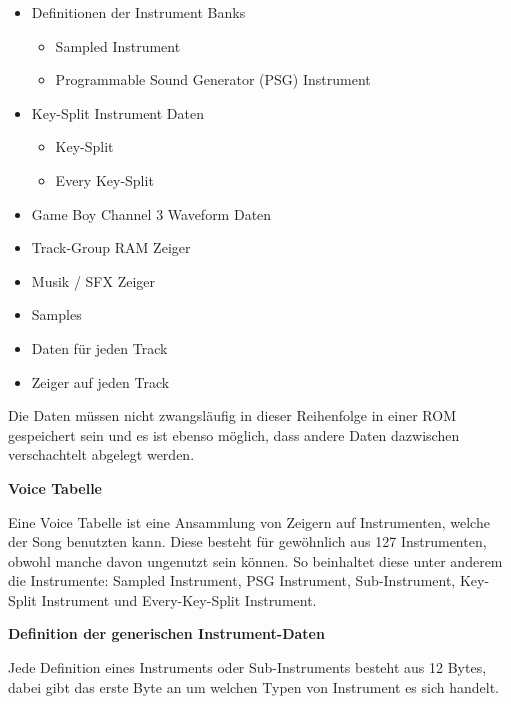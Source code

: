 \documentclass[11pt,a4paper]{scrartcl}
\newcommand{\paratitle}[1] {
    \vspace{5mm}
    \large \textbf{#1} \normalsize
    \vspace{2mm}\newline
}
\begin{document}
\begin{itemize}
    \item Definitionen der Instrument Banks
    \begin{itemize}
        \item Sampled Instrument
        \item Programmable Sound Generator (PSG) Instrument
    \end{itemize}
    
    \item Key-Split Instrument Daten
    \begin{itemize}
        \item Key-Split
        \item Every Key-Split
    \end{itemize}
    
    \item Game Boy Channel 3 Waveform Daten
    \item Track-Group RAM Zeiger
    \item Musik / SFX Zeiger
    \item Samples
    \item Daten f\"ur jeden Track
    \item Zeiger auf jeden Track
\end{itemize}

Die Daten m\"ussen nicht zwangsl\"aufig in dieser Reihenfolge in einer ROM gespeichert sein und es ist ebenso m\"oglich, dass andere Daten dazwischen verschachtelt abgelegt werden.

\paratitle{Voice Tabelle}
Eine Voice Tabelle ist eine Ansammlung von Zeigern auf Instrumenten, welche der Song benutzten kann. Diese besteht f\"ur gew\"ohnlich aus 127 Instrumenten, obwohl manche davon ungenutzt sein k\"onnen. So beinhaltet diese unter anderem die Instrumente: Sampled Instrument, PSG Instrument, Sub-Instrument, Key-Split Instrument und Every-Key-Split Instrument.

\newpage
\paratitle{Definition der generischen Instrument-Daten}
Jede Definition eines Instruments oder Sub-Instruments besteht aus 12 Bytes, dabei gibt das erste Byte an um welchen Typen von Instrument es sich handelt.
\end{document}
